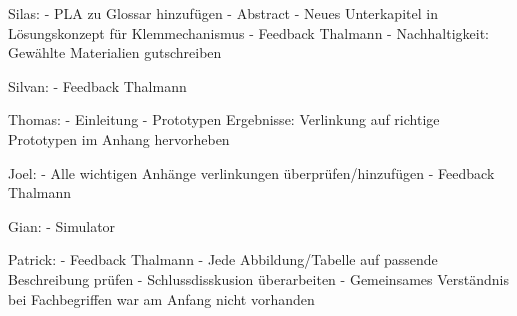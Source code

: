 Silas:
- PLA zu Glossar hinzufügen
- Abstract
- Neues Unterkapitel in Lösungskonzept für Klemmechanismus
- Feedback Thalmann
- Nachhaltigkeit: Gewählte Materialien gutschreiben

Silvan:
- Feedback Thalmann

Thomas:
- Einleitung
- Prototypen Ergebnisse: Verlinkung auf richtige Prototypen im Anhang hervorheben

Joel:
- Alle wichtigen Anhänge verlinkungen überprüfen/hinzufügen
- Feedback Thalmann

Gian:
- Simulator

Patrick:
- Feedback Thalmann
- Jede Abbildung/Tabelle auf passende Beschreibung prüfen
- Schlussdisskusion überarbeiten
  - Gemeinsames Verständnis bei Fachbegriffen war am Anfang nicht vorhanden

